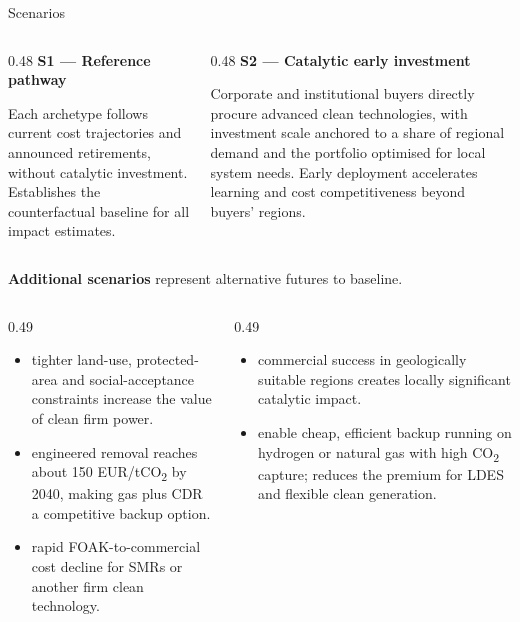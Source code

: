 \documentclass[11pt,aspectratio=169,t]{beamer}
\begin{document}
\begin{frame}{Scenarios}
  \vspace{-0.35cm}
  \begin{columns}[T]
    \begin{column}{0.48\textwidth}
      \footnotesize
      \textbf{\alert{S1 --- Reference pathway}}\par
      Each archetype follows current cost trajectories and announced retirements, without catalytic investment. \alert{Establishes the counterfactual baseline} for all impact estimates.
    \end{column}
    \begin{column}{0.48\textwidth}
      \footnotesize
      \textbf{\alert{S2 --- Catalytic early investment}}\par
      Corporate and institutional buyers directly procure advanced clean technologies, with investment scale anchored to a share of regional demand and the portfolio optimised for local system needs. \alert{Early deployment accelerates learning and cost competitiveness} beyond buyers' regions.
    \end{column}
  \end{columns}

  \vspace{0.1cm}
  {\scriptsize\textbf{Additional scenarios} represent alternative futures to baseline.}
  \vspace{-0.15cm}
  \begin{columns}[T]
    \begin{column}{0.49\textwidth}
      \tiny
      \begin{itemize}\setlength{\itemsep}{0.2em}
        \item {} tighter land-use, protected-area and social-acceptance constraints increase the value of clean firm power.
        \item {} engineered removal reaches about 150 EUR/tCO\textsubscript{2} by 2040, making gas plus CDR a competitive backup option.
        \item {} rapid FOAK-to-commercial cost decline for SMRs or another firm clean technology.
      \end{itemize}
    \end{column}
    \begin{column}{0.49\textwidth}
      \tiny
      \begin{itemize}\setlength{\itemsep}{0.2em}
        \item {} commercial success in geologically suitable regions creates locally significant catalytic impact.
        \item {} enable cheap, efficient backup running on hydrogen or natural gas with high CO\textsubscript{2} capture; reduces the premium for LDES and flexible clean generation.
      \end{itemize}
    \end{column}
  \end{columns}
\end{frame}
\end{document}
